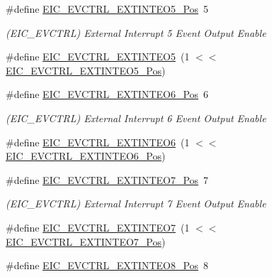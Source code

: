 \begin{DoxyCompactItemize}
\item 
\#define \mbox{\hyperlink{group___s_a_m_d21___e_i_c_gae3b6013cb283d41b444af13f51a517cb}{E\+I\+C\+\_\+\+E\+V\+C\+T\+R\+L\+\_\+\+E\+X\+T\+I\+N\+T\+E\+O5\+\_\+\+Pos}}~5
\begin{DoxyCompactList}\small\item\em (E\+I\+C\+\_\+\+E\+V\+C\+T\+RL) External Interrupt 5 Event Output Enable \end{DoxyCompactList}\item 
\#define \mbox{\hyperlink{group___s_a_m_d21___e_i_c_gae0d76882efbda24a2c0d7d24f4c43490}{E\+I\+C\+\_\+\+E\+V\+C\+T\+R\+L\+\_\+\+E\+X\+T\+I\+N\+T\+E\+O5}}~(1 $<$$<$ \mbox{\hyperlink{group___s_a_m_d21___e_i_c_gae3b6013cb283d41b444af13f51a517cb}{E\+I\+C\+\_\+\+E\+V\+C\+T\+R\+L\+\_\+\+E\+X\+T\+I\+N\+T\+E\+O5\+\_\+\+Pos}})
\item 
\#define \mbox{\hyperlink{group___s_a_m_d21___e_i_c_ga95ebc723740e7e916817a753131144e9}{E\+I\+C\+\_\+\+E\+V\+C\+T\+R\+L\+\_\+\+E\+X\+T\+I\+N\+T\+E\+O6\+\_\+\+Pos}}~6
\begin{DoxyCompactList}\small\item\em (E\+I\+C\+\_\+\+E\+V\+C\+T\+RL) External Interrupt 6 Event Output Enable \end{DoxyCompactList}\item 
\#define \mbox{\hyperlink{group___s_a_m_d21___e_i_c_gaa3f99ae35b11fb996f4333e248100c3b}{E\+I\+C\+\_\+\+E\+V\+C\+T\+R\+L\+\_\+\+E\+X\+T\+I\+N\+T\+E\+O6}}~(1 $<$$<$ \mbox{\hyperlink{group___s_a_m_d21___e_i_c_ga95ebc723740e7e916817a753131144e9}{E\+I\+C\+\_\+\+E\+V\+C\+T\+R\+L\+\_\+\+E\+X\+T\+I\+N\+T\+E\+O6\+\_\+\+Pos}})
\item 
\#define \mbox{\hyperlink{group___s_a_m_d21___e_i_c_ga69d864d864249b36e4310ab9377c3c97}{E\+I\+C\+\_\+\+E\+V\+C\+T\+R\+L\+\_\+\+E\+X\+T\+I\+N\+T\+E\+O7\+\_\+\+Pos}}~7
\begin{DoxyCompactList}\small\item\em (E\+I\+C\+\_\+\+E\+V\+C\+T\+RL) External Interrupt 7 Event Output Enable \end{DoxyCompactList}\item 
\#define \mbox{\hyperlink{group___s_a_m_d21___e_i_c_gae3d72773fb60767a3d0bf56ecabed18c}{E\+I\+C\+\_\+\+E\+V\+C\+T\+R\+L\+\_\+\+E\+X\+T\+I\+N\+T\+E\+O7}}~(1 $<$$<$ \mbox{\hyperlink{group___s_a_m_d21___e_i_c_ga69d864d864249b36e4310ab9377c3c97}{E\+I\+C\+\_\+\+E\+V\+C\+T\+R\+L\+\_\+\+E\+X\+T\+I\+N\+T\+E\+O7\+\_\+\+Pos}})
\item 
\#define \mbox{\hyperlink{group___s_a_m_d21___e_i_c_gab85176b4359e5d32805337285401b2e3}{E\+I\+C\+\_\+\+E\+V\+C\+T\+R\+L\+\_\+\+E\+X\+T\+I\+N\+T\+E\+O8\+\_\+\+Pos}}~8
$$
\end{DoxyCompactItemize}

